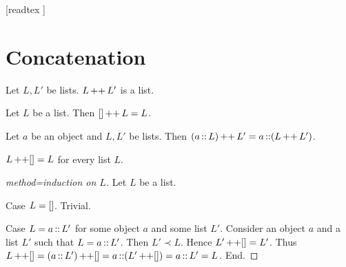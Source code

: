 \documentclass[10pt]{article}
\begin{document}
  \begin{imports}
    \begin{forthel}
      [readtex ]
    \end{forthel}
  \end{imports}


  \section*{Concatenation}

  \begin{forthel}
    \begin{signature}[id=LISTS_CONCAT_4578620297183232,printid]
      Let $L, L'$ be lists.
      $L \mathop{++} L'$ is a list.
    \end{signature}
  \end{forthel}

  \begin{forthel}
    \begin{axiom}[id=LISTS_CONCAT_3703161885818880,printid]
      Let $L$ be a list.
      Then $[] \mathop{++} L = L$.
    \end{axiom}
  \end{forthel}

  \begin{forthel}
    \begin{axiom}[id=LISTS_CONCAT_8050301789536256,printid]
      Let $a$ be an object and $L, L'$ be lists.
      Then $(a \mathop{::} L) \mathop{++} L' = a \mathop{::} (L \mathop{++} L')$.
    \end{axiom}
  \end{forthel}

  \begin{forthel}
    \begin{proposition}[id=LISTS_CONCAT_4512036658964875,printid]
      $L \mathop{++} [] = L$ for every list $L$.
    \end{proposition}
    \begin{proof}[method=induction on $L$]
      Let $L$ be a list.

      Case $L = []$. Trivial.
      
      Case $L = a \mathop{::} L'$ for some object $a$ and some list $L'$.
        Consider an object $a$ and a list $L'$ such that $L = a \mathop{::} L'$.
        Then $L' \prec L$.
        Hence $L' \mathop{++} [] = L'$.
        Thus $L \mathop{++} []
          = (a \mathop{::} L') \mathop{++} []
          = a \mathop{::} (L' \mathop{++} [])
          = a \mathop{::} L'
          = L$.
      End.
    \end{proof}
  \end{forthel}
\end{document}
